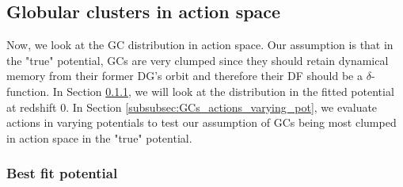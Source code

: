 \subsection{Globular clusters in action space}\label{subsec:GCs_action_space}
Now, we look at the \ac{GC} distribution in action space. Our assumption is that in the "true" potential, \acp{GC} are very clumped since they should retain dynamical memory from their former \ac{DG}'s orbit and therefore their \ac{DF} should be a $\delta$-function. In Section \ref{subsubsec:GCs_actions_right_pot}, we will look at the distribution in the fitted potential at redshift 0. In Section \ref{subsubsec:GCs_actions_varying_pot}, we evaluate actions in varying potentials to test our assumption of \acp{GC} being most clumped in action space in the "true" potential. 

\subsubsection{Best fit potential}\label{subsubsec:GCs_actions_right_pot}


